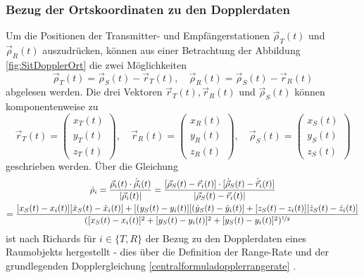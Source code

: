 \documentclass[a4paper,12pt]{article}
\numberwithin{equation}{section}
\begin{document}
\subsubsection{Bezug der Ortskoordinaten zu den Dopplerdaten}
Um die Positionen der Transmitter- und Empfängerstationen $\vec{\rho}_T(t)$ und $\vec{\rho}_R(t)$  auszudrücken, können aus einer Betrachtung der Abbildung \ref{fig:SitDopplerOrt} die zwei Möglichkeiten \begin{equation}
\vec{\rho}_T(t) = \vec{\rho}_S(t) - \vec{r}_T(t), \quad \vec{\rho}_R(t) = \vec{\rho}_S(t) - \vec{r}_R(t)
\end{equation} abgelesen werden. Die drei Vektoren $\vec{r}_T(t), \vec{r}_R(t)$ und $\vec{\rho}_S(t)$ können komponentenweise zu \begin{equation}\label{eq:notationfurtherbermitrhos}
\vec{r}_T(t) = \begin{pmatrix}
x_T(t) \\ y_T(t) \\ z_T(t)
\end{pmatrix}, \quad \vec{r}_R(t) = \begin{pmatrix}
x_R(t) \\ y_R(t) \\ z_R(t)
\end{pmatrix}, \quad \vec{\rho}_S(t) = \begin{pmatrix}
x_S(t) \\ y_S(t) \\ z_S(t)
\end{pmatrix}
\end{equation} geschrieben werden. Über die Gleichung \footnotesize \begin{gather}\begin{gathered}
\dot{\rho}_i = \frac{\vec{\rho}_i(t)\cdot \dot{\vec{\rho}}_i(t)}{|\vec{\rho}_i(t)|} = \frac{[\vec{\rho}_S(t) - \vec{r}_i(t)] \cdot [\dot{\vec{\rho}}_S(t) - \dot{\vec{r}}_i(t)]}{|\vec{\rho}_S(t) - \vec{r}_i(t)|} \\ = \frac{[x_S(t)-x_i(t)][\dot{x}_S(t)-\dot{x}_i(t)]+[(y_S(t)-y_i(t)][(\dot{y}_S(t)-\dot{y}_i(t)]+[z_S(t)-z_i(t)][\dot{z}_S(t)-\dot{z}_i(t)]}{([x_S(t)-x_i(t)]^2 + [y_S(t)-y_i(t)]^2 + [y_S(t)-y_i(t)]^2)^{\nicefrac{1}{2}}}
\end{gathered}\end{gather} \normalsize ist nach Richards für $i \in \{T,R\}$ der Bezug zu den Dopplerdaten eines Raumobjekts hergestellt - dies über die Definition der Range-Rate und der grundlegenden Dopplergleichung \eqref{centralformuladopplerrangerate} \cite[S.1729]{Richards.1961}.
\end{document}
